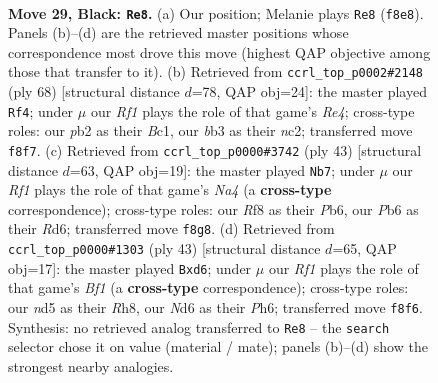 \documentclass[11pt]{article}
\begin{document}
\clearpage

\begin{figure}[p]\centering
\begin{subfigure}{0.46\textwidth}\centering
\resizebox{\linewidth}{!}{%
\newchessgame
\chessboard[
  setfen={r2k1r1b/2pb4/pp1n3B/3Npp2/P6R/1B3N2/1P2KPP1/R7 b - - 1 29},
  showmover=false,
  pgfstyle=straightmove, color=movearrow, markmove={f8-e8}
]}
\caption{}
\end{subfigure}\hfill
\begin{subfigure}{0.46\textwidth}\centering
\resizebox{\linewidth}{!}{%
\newchessgame
\chessboard[
  setfen={6k1/4brp1/b1p4p/p1n1PP2/2P1R1P1/2N4P/1Pn5/2BR2K1 w - - 5 35},
  showmover=false,
  pgfstyle=straightmove, color=movearrow, markmove={e4-f4}
]}
\caption{}
\end{subfigure}
\\[4pt]
\begin{subfigure}{0.46\textwidth}\centering
\resizebox{\linewidth}{!}{%
\newchessgame
\chessboard[
  setfen={r4k2/5pbp/1p1r2p1/nR6/2p5/5N1P/PPR1BPP1/6K1 b - - 3 22},
  showmover=false,
  pgfstyle=straightmove, color=movearrow, markmove={a5-b7}
]}
\caption{}
\end{subfigure}\hfill
\begin{subfigure}{0.46\textwidth}\centering
\resizebox{\linewidth}{!}{%
\newchessgame
\chessboard[
  setfen={r3kb1r/8/p2Bpp1p/1ppn3P/4N2R/5PP1/PPP5/2KR4 b kq - 1 22},
  showmover=false,
  pgfstyle=straightmove, color=movearrow, markmove={f8-d6}
]}
\caption{}
\end{subfigure}
\caption{\textbf{Move 29, Black: \texttt{Re8}.} (a) Our position; Melanie plays \texttt{Re8} (\texttt{f8e8}). Panels (b)--(d) are the retrieved master positions whose correspondence most drove this move (highest QAP objective among those that transfer to it). (b) Retrieved from \texttt{ccrl\_top\_p0002\#2148} (ply 68) [structural distance $d$=78, QAP obj=24]: the master played \texttt{Rf4}; under $\mu$ our \emph{Rf1} plays the role of that game's \emph{Re4}; cross-type roles: our \emph{p}b2 as their \emph{B}c1, our \emph{b}b3 as their \emph{n}c2; transferred move \texttt{f8f7}. (c) Retrieved from \texttt{ccrl\_top\_p0000\#3742} (ply 43) [structural distance $d$=63, QAP obj=19]: the master played \texttt{Nb7}; under $\mu$ our \emph{Rf1} plays the role of that game's \emph{Na4} (a \textbf{cross-type} correspondence); cross-type roles: our \emph{R}f8 as their \emph{P}b6, our \emph{P}b6 as their \emph{R}d6; transferred move \texttt{f8g8}. (d) Retrieved from \texttt{ccrl\_top\_p0000\#1303} (ply 43) [structural distance $d$=65, QAP obj=17]: the master played \texttt{Bxd6}; under $\mu$ our \emph{Rf1} plays the role of that game's \emph{Bf1} (a \textbf{cross-type} correspondence); cross-type roles: our \emph{n}d5 as their \emph{R}h8, our \emph{N}d6 as their \emph{P}h6; transferred move \texttt{f8f6}. Synthesis: no retrieved analog transferred to \texttt{Re8} -- the \texttt{search} selector chose it on value (material / mate); panels (b)--(d) show the strongest nearby analogies.}
\label{fig:thought-m57}
\end{figure}
\end{document}
